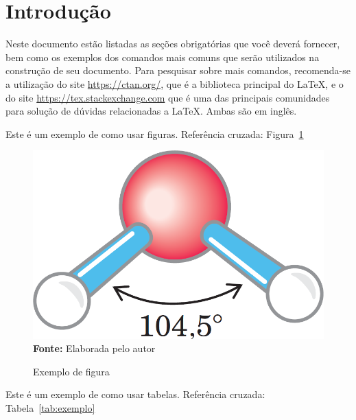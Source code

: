 \documentclass[
	article,			%
	11pt,				%
	oneside,			%
	a4paper,			%
	chapter=TITLE,		%
	section=TITLE,		%
	english,			%
	brazil,				%
	sumario=tradicional
]{abntex2}
\begin{document}
	\section{Introdução}
	
    Neste documento estão listadas as seções obrigatórias que você deverá fornecer, bem como os exemplos dos comandos mais comuns que serão utilizados na construção de seu documento. Para pesquisar sobre mais comandos, recomenda-se a utilização do site \url{https://ctan.org/}, que é a biblioteca principal do \LaTeX, e o do site \url{https://tex.stackexchange.com} que é uma das principais comunidades para solução de dúvidas relacionadas a \LaTeX. Ambas são em inglês.
    
	Este é um exemplo de como usar figuras. Referência cruzada: Figura~\ref{fig:exemplo}
	
	\FloatBarrier
	\begin{figure}[!htbp]
		\centering
		\caption{Exemplo de figura}
		\includegraphics[scale=0.20]{imagens/exemplo}
		\\\textbf{Fonte:} Elaborada pelo autor
		\label{fig:exemplo}
	\end{figure}
	\FloatBarrier
	
	
	Este é um exemplo de como usar tabelas. Referência cruzada: Tabela~\ref{tab:exemplo}
	
\end{document}
